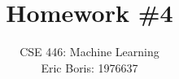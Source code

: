 \title{Homework \#4} 
\author{\normalsize{CSE 446: Machine Learning}\\ 
\normalsize{Eric Boris: 1976637}}
\maketitle
